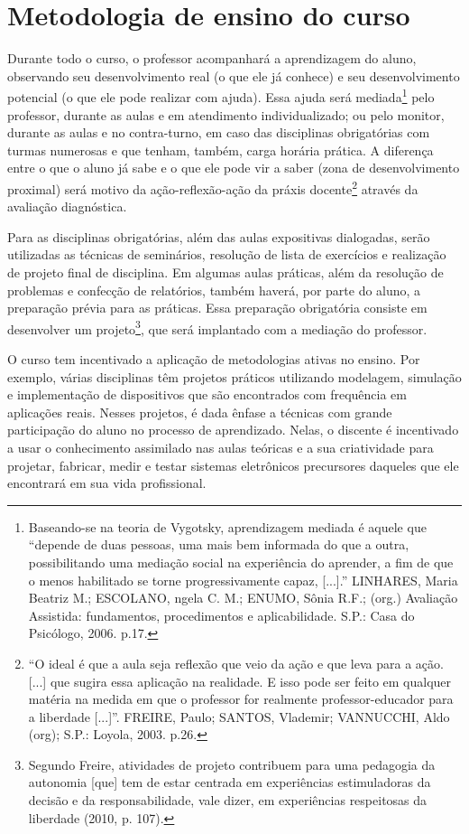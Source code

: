 \chapter{Metodologia de ensino do curso}
\label{cap8}

Durante todo o curso, o professor acompanhará a aprendizagem do aluno, observando seu desenvolvimento real (o que ele já conhece) e seu desenvolvimento potencial (o que ele pode realizar com ajuda). Essa ajuda será mediada\footnote[2]{Baseando-se na teoria de Vygotsky, aprendizagem mediada é aquele que “depende de duas pessoas, uma mais bem informada do que a outra, possibilitando uma mediação social na experiência do aprender, a fim de que o menos habilitado se torne progressivamente capaz, [...].” LINHARES, Maria Beatriz M.; ESCOLANO,  ngela C. M.; ENUMO, Sônia R.F.; (org.) Avaliação Assistida: fundamentos, procedimentos e aplicabilidade. S.P.: Casa do Psicólogo, 2006. p.17.} pelo professor, durante as aulas e em atendimento individualizado; ou pelo monitor, durante as aulas e no contra-turno, em caso das disciplinas obrigatórias com turmas numerosas e que tenham, também, carga horária prática. A diferença entre o que o aluno já sabe e o que ele pode vir a saber (zona de desenvolvimento proximal) será motivo da ação-reflexão-ação da práxis docente\footnote[3]{“O ideal é que a aula seja reflexão que veio da ação e que leva para a ação. [...] que sugira essa aplicação na realidade. E isso pode ser feito em qualquer matéria na medida em que o professor for realmente professor-educador para a liberdade [...]”. FREIRE, Paulo; SANTOS, Vlademir; VANNUCCHI, Aldo (org); S.P.: Loyola, 2003. p.26.} através da avaliação diagnóstica. 

Para as disciplinas obrigatórias, além das aulas expositivas dialogadas, serão utilizadas as técnicas de seminários, resolução de lista de exercícios e realização de projeto final de disciplina. Em algumas aulas práticas, além da resolução de problemas e confecção de relatórios, também haverá, por parte do aluno, a preparação prévia para as práticas. Essa preparação obrigatória consiste em desenvolver um projeto\footnote[4]{Segundo Freire, atividades de projeto contribuem para uma pedagogia da autonomia [que] tem de estar centrada em experiências estimuladoras da decisão e da responsabilidade, vale dizer, em experiências respeitosas da liberdade (2010, p. 107).}, que será implantado com a mediação do professor. 

O curso tem incentivado a aplicação de metodologias ativas no ensino. Por exemplo, várias disciplinas têm projetos práticos utilizando modelagem, simulação e implementação de dispositivos que são encontrados com frequência em aplicações reais. Nesses projetos, é dada ênfase a técnicas com grande participação do aluno no processo de aprendizado. Nelas, o discente é incentivado a usar o conhecimento assimilado nas aulas teóricas e a sua criatividade para projetar, fabricar, medir e testar sistemas eletrônicos precursores daqueles que ele encontrará em sua vida profissional.

